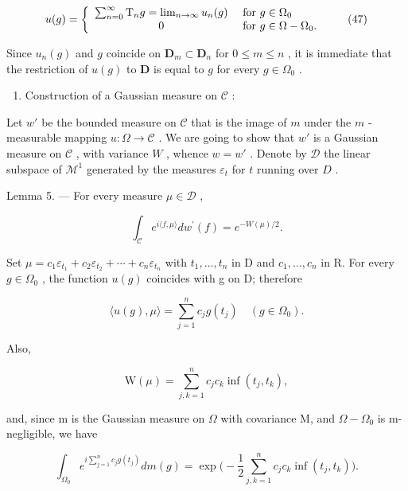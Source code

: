 \[
u (g) = \left\{ \begin{array}{c l} \sum_ {n = 0} ^ {\infty} \mathrm{T} _ {n} g = \lim _ {n \to \infty} u _ {n} (g) & \text { for } g \in \Omega_ {0} \\ 0 & \text { for } g \in \Omega - \Omega_ {0}. \end{array} \right.\tag{47}
\]

Since \(u_{n}(g)\) and \(g\) coincide on \(\mathbf{D}_m \subset \mathbf{D}_n\) for \(0 \leqslant m \leqslant n\) , it is immediate that the restriction of \(u(g)\) to \(\mathbf{D}\) is equal to \(g\) for every \(g \in \Omega_0\) .

\begin{enumerate}
\def\labelenumi{\Alph{enumi})}
\setcounter{enumi}{2}
\tightlist
\item
  Construction of a Gaussian measure on \(\mathcal{C}\) :
\end{enumerate}

Let \(w'\) be the bounded measure on \(\mathcal{C}\) that is the image of \(m\) under the \(m\) -measurable mapping \(u: \Omega \to \mathcal{C}\) . We are going to show that \(w'\) is a Gaussian measure on \(\mathcal{C}\) , with variance \(W\) , whence \(w = w'\) . Denote by \(\mathcal{D}\) the linear subspace of \(\mathcal{M}^1\) generated by the measures \(\varepsilon_t\) for \(t\) running over \(D\) .

Lemma 5. --- For every measure \(\mu \in \mathcal{D}\) ,

\[
\int_ {\mathcal {C}} e ^ {i \langle f, \mu \rangle} d w ^ {\prime} (f) = e ^ {- W (\mu) / 2}.\tag{48}
\]

Set \(\mu=c_{1}\varepsilon_{t_{1}}+c_{2}\varepsilon_{t_{2}}+\cdots+c_{n}\varepsilon_{t_{n}}\) with \(t_{1},\ldots,t_{n}\) in D and \(c_{1},\ldots,c_{n}\) in R. For every \(g\in\Omega_{0}\) , the function \(u(g)\) coincides with g on D; therefore

\[
\langle u (g), \mu \rangle = \sum_ {j = 1} ^ {n} c _ {j} g (t _ {j}) \quad (g \in \Omega_ {0}).\tag{49}
\]

Also,

\[
\mathrm{W} (\mu) = \sum_ {j, k = 1} ^ {n} c _ {j} c _ {k} \inf (t _ {j}, t _ {k}),\tag{50}
\]

and, since m is the Gaussian measure on \(\Omega\) with covariance M, and \(\Omega - \Omega_{0}\) is m-negligible, we have

\[
\int_ {\Omega_ {0}} e ^ {i \sum_ {j = 1} ^ {n} c _ {j} g (t _ {j})} d m (g) = \exp \Big (- \frac {1}{2} \sum_ {j, k = 1} ^ {n} c _ {j} c _ {k} \inf (t _ {j}, t _ {k}) \Big).\tag{51}
\]

